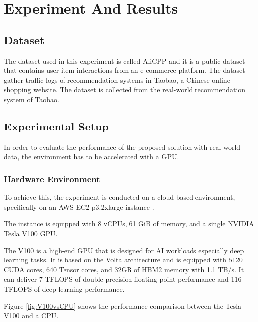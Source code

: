 \chapter{Experiment And Results}
\minitoc

\section{Dataset}

The dataset used in this experiment is called AliCPP and it is a public dataset that contains user-item interactions from an e-commerce platform. The dataset gather traffic logs of recommendation systems in Taobao, a Chinese online shopping website. The dataset is collected from the real-world recommendation system of Taobao.\cite{AliCPP}


\section{Experimental Setup}

In order to evaluate the performance of the proposed solution with real-world data, the environment has to be accelerated with a GPU.

\subsection{Hardware Environment}

To achieve this, the experiment is conducted on a cloud-based environment, specifically on an AWS EC2 p3.2xlarge instance \cite{AwsEc2P3}.

The instance is equipped with 8 vCPUs, 61 GiB of memory, and a single NVIDIA Tesla V100 GPU.

The V100 is a high-end GPU that is designed for AI workloads especially deep learning tasks.
It is based on the Volta architecture and is equipped with 5120 CUDA cores, 640 Tensor cores, and 32GB of HBM2 memory with 1.1 TB/s.
It can deliver 7 TFLOPS of double-precision floating-point performance and 116 TFLOPS of deep learning performance.

Figure \ref{fig:V100vsCPU} shows the performance comparison between the Tesla V100 and a CPU.


